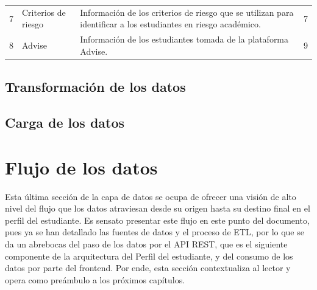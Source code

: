 \begin{table}[h]
\begin{tabular}{cp{2.3cm}p{7cm}c}
		7              & Criterios \newline de riesgo                       & Información de los criterios de riesgo que se utilizan para identificar a los estudiantes en riesgo académico.                       & 7                        \\
		8              & Advise                                             & Información de los estudiantes tomada de la plataforma Advise.                                                                       & 9                        \\
		\hline
	\end{tabular}
	\label{tab:extraccion}
\end{table}

\subsection{Transformación de los datos}


\subsection{Carga de los datos}


\section{Flujo de los datos}

Esta última sección de la capa de datos se ocupa de ofrecer una visión de alto nivel del flujo que los datos atraviesan desde su origen hasta su destino final en el perfil del estudiante. Es sensato presentar este flujo en este punto del documento, pues ya se han detallado las fuentes de datos y el proceso de \gls{ETL}, por lo que se da un abrebocas del paso de los datos por el API REST, que es el siguiente componente de la arquitectura del Perfil del estudiante, y del consumo de los datos por parte del frontend. Por ende, esta sección contextualiza al lector y opera como preámbulo a los próximos capítulos.

